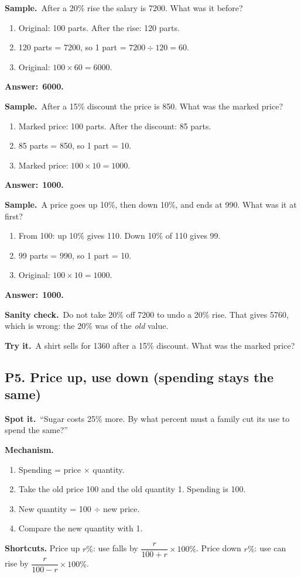\documentclass[11pt,a4paper]{article}
\let\oldsubsection\subsection
\renewcommand{\subsection}{\needspace{9\baselineskip}\oldsubsection}
\newcommand{\spot}{\textbf{\color{ember}Spot it.}\ }
\newcommand{\mech}{\textbf{\color{ember}Mechanism.}\ }
\newif\ifkeepsamp
\newcommand{\ans}[1]{\par\nopagebreak\noindent\textbf{\color{ember}Answer:}\ \textbf{#1}\par}
\newcommand{\samp}{\ifkeepsamp\needspace{4\baselineskip}\fi\textbf{\color{ember}Sample.}\ }
\newcommand{\sane}{\textbf{\color{slate}Sanity check.}\ }
\newcommand{\tryit}[1]{\textbf{\color{ember}Try it.}\ #1}
\begin{document}
\samp After a 20\% rise the salary is 7200. What was it before?
\begin{enumerate}
\item Original: 100 parts. After the rise: 120 parts.
\item 120 parts = 7200, so 1 part = $7200 \div 120 = 60$.
\item Original: $100 \times 60 = 6000$.
\end{enumerate}
\ans{6000.}

\samp After a 15\% discount the price is 850. What was the marked price?
\begin{enumerate}
\item Marked price: 100 parts. After the discount: 85 parts.
\item 85 parts = 850, so 1 part = 10.
\item Marked price: $100 \times 10 = 1000$.
\end{enumerate}
\ans{1000.}

\samp A price goes up 10\%, then down 10\%, and ends at 990. What was it at first?
\begin{enumerate}
\item From 100: up 10\% gives 110. Down 10\% of 110 gives 99.
\item 99 parts = 990, so 1 part = 10.
\item Original: $100 \times 10 = 1000$.
\end{enumerate}
\ans{1000.}

\sane Do not take 20\% off 7200 to undo a 20\% rise. That gives 5760, which is wrong: the 20\% was of the \emph{old} value.

\tryit A shirt sells for 1360 after a 15\% discount. What was the marked price?

\subsection{P5. Price up, use down (spending stays the same)}
\spot ``Sugar costs 25\% more. By what percent must a family cut its use to spend the same?''

\mech
\begin{enumerate}
\item Spending = price $\times$ quantity.
\item Take the old price 100 and the old quantity 1. Spending is 100.
\item New quantity = 100 $\div$ new price.
\item Compare the new quantity with 1.
\end{enumerate}
\textbf{Shortcuts.} Price up $r\%$: use falls by $\dfrac{r}{100+r}\times 100\%$. Price down $r\%$: use can rise by $\dfrac{r}{100-r}\times 100\%$.
\end{document}
